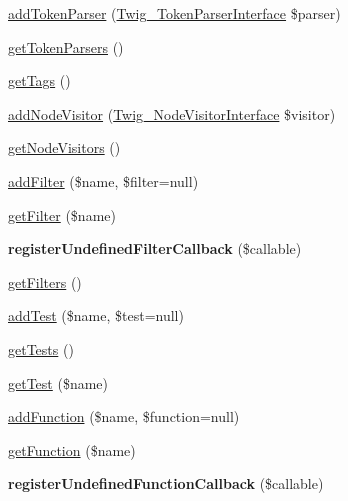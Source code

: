 \begin{DoxyCompactItemize}
\item 
\hyperlink{class_twig___environment_a8f805d29eac2b8ce1da513e9390952f3}{add\+Token\+Parser} (\hyperlink{interface_twig___token_parser_interface}{Twig\+\_\+\+Token\+Parser\+Interface} \$parser)
\item 
\hyperlink{class_twig___environment_a8fd35903c3d01c0f0078f59d142eb063}{get\+Token\+Parsers} ()
\item 
\hyperlink{class_twig___environment_ae07173ab06a20e2f5bd928cc0518e01f}{get\+Tags} ()
\item 
\hyperlink{class_twig___environment_adc294d7c409f47d2c26847601897c6db}{add\+Node\+Visitor} (\hyperlink{interface_twig___node_visitor_interface}{Twig\+\_\+\+Node\+Visitor\+Interface} \$visitor)
\item 
\hyperlink{class_twig___environment_aec02093179d390d22ae4083f23a1d74a}{get\+Node\+Visitors} ()
\item 
\hyperlink{class_twig___environment_a07b5aed0599bf6b5a959138a50c20934}{add\+Filter} (\$name, \$filter=null)
\item 
\hyperlink{class_twig___environment_a4a7bab9eccf45585b757bc4637d49c51}{get\+Filter} (\$name)
\item 
\hypertarget{class_twig___environment_a34e0732405a6c7994b333ce2f8a1deb0}{}{\bfseries register\+Undefined\+Filter\+Callback} (\$callable)\label{class_twig___environment_a34e0732405a6c7994b333ce2f8a1deb0}

\item 
\hyperlink{class_twig___environment_a428d91319fc73d3038784cf5436936b6}{get\+Filters} ()
\item 
\hyperlink{class_twig___environment_abffdc04383a36adfedf9e01be73eb577}{add\+Test} (\$name, \$test=null)
\item 
\hyperlink{class_twig___environment_a7e247dd31cc8d37a6c97353a062a0080}{get\+Tests} ()
\item 
\hyperlink{class_twig___environment_a981e961a31852f7ad5ff8176a886208c}{get\+Test} (\$name)
\item 
\hyperlink{class_twig___environment_a6e2559ac470ee7534cd0c717c74fb1d4}{add\+Function} (\$name, \$function=null)
\item 
\hyperlink{class_twig___environment_ae4433c0b7cff67452143bc6abd237330}{get\+Function} (\$name)
\item 
\hypertarget{class_twig___environment_a64b35a5fbb8691099c5fcdb36e763779}{}{\bfseries register\+Undefined\+Function\+Callback} (\$callable)\label{class_twig___environment_a64b35a5fbb8691099c5fcdb36e763779}


\end{DoxyCompactItemize}
